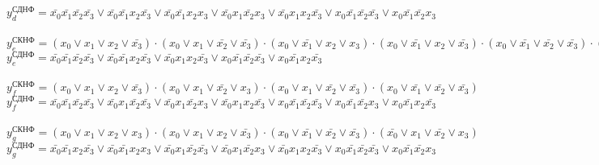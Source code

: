 \documentclass{bmstu}
\begin{document}
    $y^{\text{СДНФ}}_d = \bar{x_0} \bar{x_1} \bar{x_2} \bar{x_3} \vee
    					 \bar{x_0} \bar{x_1} x_2 \bar{x_3} \vee 
   						 \bar{x_0} \bar{x_1} x_2 x_3 \vee
   						 \bar{x_0} x_1 \bar{x_2} x_3 \vee 
   						 \bar{x_0} x_1 x_2 \bar{x_3} \vee 
   						 x_0 \bar{x_1} \bar{x_2} \bar{x_3} \vee 
   						 x_0 \bar{x_1} \bar{x_2} x_3$
	\\
	\\
    $y^{\text{СКНФ}}_e = (x_0 \vee x_1 \vee x_2 \vee \bar{x_3}) \cdot
    					 (x_0 \vee x_1 \vee \bar{x_2} \vee \bar{x_3}) \cdot
    					 (x_0 \vee \bar{x_1} \vee x_2 \vee x_3) \cdot 
    					 (x_0 \vee \bar{x_1} \vee x_2 \vee \bar{x_3}) \cdot 
    					 (x_0 \vee \bar{x_1} \vee \bar{x_2} \vee \bar{x_3}) \cdot 
    					 (\bar{x_0} \vee x_1 \vee x_2 \vee \bar{x_3})$ \\
    $y^{\text{СДНФ}}_e = \bar{x_0} \bar{x_1} \bar{x_2} \bar{x_3} \vee
    					 \bar{x_0} \bar{x_1} x_2 \bar{x_3} \vee 
    					 \bar{x_0} x_1 x_2 \bar{x_3} \vee
    					 x_0 \bar{x_1} \bar{x_2} \bar{x_3} \vee
    					 x_0 \bar{x_1} x_2 \bar{x_3}$
	\\
	\\
    $y^{\text{СКНФ}}_f = (x_0 \vee x_1 \vee x_2 \vee \bar{x_3}) \cdot 
    					 (x_0 \vee x_1 \vee \bar{x_2} \vee x_3) \cdot 
    					 (x_0 \vee x_1 \vee \bar{x_2} \vee \bar{x_3}) \cdot 
    					 (x_0 \vee \bar{x_1} \vee \bar{x_2} \vee \bar{x_3})$ \\     
    $y^{\text{СДНФ}}_f = \bar{x_0} \bar{x_1} \bar{x_2} \bar{x_3} \vee
    					 \bar{x_0} x_1 \bar{x_2} \bar{x_3} \vee 
    					 \bar{x_0} x_1 \bar{x_2} x_3 \vee
    					 \bar{x_0} x_1 x_2 \bar{x_3} \vee 
    					 x_0 \bar{x_1} \bar{x_2} \bar{x_3} \vee 
    					 x_0 \bar{x_1} \bar{x_2} x_3 \vee 
    					 x_0 \bar{x_1} x_2 \bar{x_3}$
	\\
	\\
    $y^{\text{СКНФ}}_g = (x_0 \vee x_1 \vee x_2 \vee x_3) \cdot 
    					 (x_0 \vee x_1 \vee x_2 \vee \bar{x_3}) \cdot 
    					 (x_0 \vee \bar{x_1} \vee \bar{x_2} \vee \bar{x_3}) \cdot 
    					 (\bar{x_0} \vee x_1 \vee \bar{x_2} \vee x_3)$ \\					            
    $y^{\text{СДНФ}}_g = \bar{x_0} \bar{x_1} x_2 \bar{x_3} \vee
    					 \bar{x_0} \bar{x_1} x_2 x_3 \vee 
    					 \bar{x_0} x_1 \bar{x_2} \bar{x_3} \vee
    					 \bar{x_0} x_1 \bar{x_2} x_3 \vee 
   						 \bar{x_0} x_1 x_2 \bar{x_3} \vee 
   						 x_0 \bar{x_1} \bar{x_2} \bar{x_3} \vee 
   						 x_0 \bar{x_1} \bar{x_2} x_3$

\end{document}

